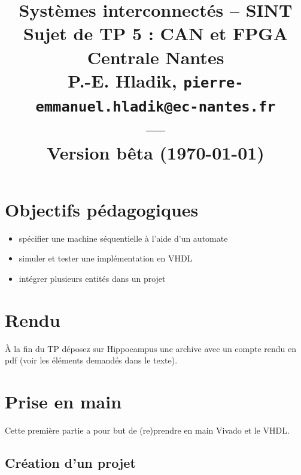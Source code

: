 \documentclass[11pt]{paper}
\title{{\Large Systèmes interconnectés -- SINT }\\
\vspace{-0.4em}
{\large Sujet de TP 5 : CAN et FPGA}\\
{\small Centrale Nantes}\\
\small P.-E. Hladik, \small{\texttt{pierre-emmanuel.hladik@ec-nantes.fr}}\\
---\\
{\scriptsize  Version bêta (\today)}\\
}
\begin{document}
\maketitle


  \section{Objectifs pédagogiques}

\begin{itemize}
	\item spécifier une machine séquentielle à l'aide d'un automate
	\item simuler et tester une implémentation en VHDL
	\item intégrer plusieurs entités dans un projet
\end{itemize}

  \section{Rendu}

À la fin du TP déposez sur Hippocampus une archive avec un compte rendu en pdf (voir les éléments demandés dans le texte).

  \section{Prise en main}

Cette première partie a pour but de (re)prendre en main Vivado et le VHDL.

\subsection{Création d'un projet}
\end{document}
